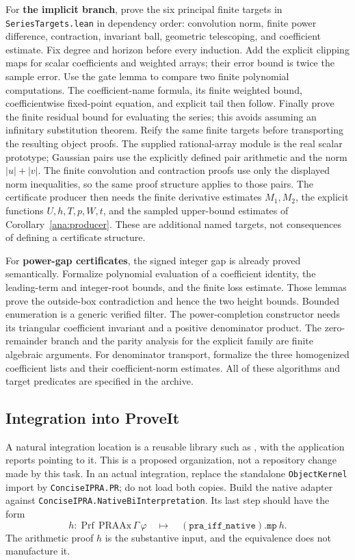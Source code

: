 For \textbf{the implicit branch}, prove the six principal finite targets
in \texttt{SeriesTargets.lean} in dependency order: convolution norm,
finite power difference, contraction, invariant ball, geometric
telescoping, and coefficient estimate.  Fix degree and horizon before
every induction.  Add the explicit clipping maps for scalar coefficients
and weighted arrays; their error bound is twice the sample error.
Use the gate lemma to compare two finite polynomial computations.
The coefficient-name formula, its finite weighted bound, coefficientwise
fixed-point equation, and explicit tail then follow.  Finally prove the
finite residual bound for evaluating the series; this avoids assuming
an infinitary substitution theorem.  Reify the same finite targets before
transporting the resulting object proofs.  The supplied rational-array
module is the real scalar prototype; Gaussian pairs use the explicitly
defined pair arithmetic and the norm $|u|+|v|$.  The finite convolution
and contraction proofs use only the displayed norm inequalities, so
the same proof structure applies to those pairs.  The certificate
producer then needs the finite derivative estimates $M_1,M_2$, the
explicit functions $U,h,T,p,W,t$, and the sampled upper-bound estimates
of Corollary~\ref{ana:producer}.  These are additional named targets,
not consequences of defining a certificate structure.

For \textbf{power-gap certificates}, the signed integer gap is already
proved semantically.  Formalize polynomial evaluation of a coefficient
identity, the leading-term and integer-root bounds, and the finite loss
estimate.  Those lemmas prove the outside-box contradiction and hence
the two height bounds.  Bounded enumeration is a generic verified filter.
The power-completion constructor needs its triangular coefficient
invariant and a positive denominator product.  The zero-remainder branch
and the parity analysis for the explicit family are finite algebraic
arguments.  For denominator transport, formalize the three homogenized
coefficient lists and their coefficient-norm estimates.  All of these
algorithms and target predicates are specified in the archive.

\subsection{Integration into ProveIt}

A natural integration location is a reusable library such as
, with the
application reports pointing to it.  This is a proposed organization,
not a repository change made by this task.  In an actual integration,
replace the standalone \texttt{ObjectKernel} import by
\texttt{ConciseIPRA.PR}; do not load both copies.  Build the native
adapter against \texttt{ConciseIPRA.NativeBiInterpretation}.  Its last
step should have the form
\[
 h:\operatorname{Prf}\,\mathrm{PRAAx}\,\Gamma\,\varphi
 \quad\longmapsto\quad
 (\texttt{pra\_iff\_native}).\texttt{mp}\ h.
\]
The arithmetic proof \(h\) is the substantive input, and the equivalence
does not manufacture it.

